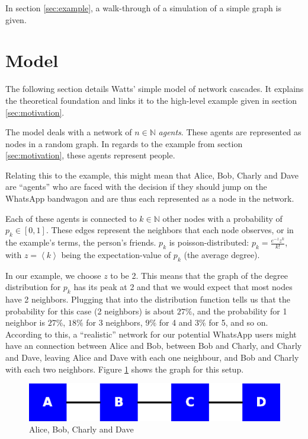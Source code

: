 \documentclass{sig-alternate-05-2015}
\begin{document}
In section \ref{sec:example}, a walk-through of a simulation of a simple graph is given.


\section{Model}\label{sec:model}

The following section details Watts' simple model of network cascades\cite{simplemodel}. It explains the theoretical foundation and links it to the high-level example given in section \ref{sec:motivation}.

The model deals with a network of $n \in \mathbb{N}$ \emph{agents}. These agents are represented as nodes in a random graph. In regards to the example from section \ref{sec:motivation}, these agents represent people.

Relating this to the example, this might mean that Alice, Bob, Charly and Dave are ``agents'' who are faced with the decision if they should jump on the WhatsApp bandwagon and are thus each represented as a node in the network.

Each of these agents is connected to $k \in \mathbb{N}$ other nodes with a probability of $p_k \in [0,1]$. These edges represent the neighbors that each node observes, or in the example's terms, the person's friends. $p_k$ is poisson-distributed: $p_k = \frac{e^{-z}z^k}{k!}$, with $z = \left<k\right>$ being the expectation-value of $p_k$ (the average degree).

In our example, we choose $z$ to be 2. This means that the graph of the degree distribution for $p_k$ has its peak at 2 and that we would expect that most nodes have 2 neighbors. Plugging that into the distribution function tells us that the probability for this case (2 neighbors) is about $27\%$, and the probability for 1 neighbor is $27\%$, $18\%$ for 3 neighbors, $9\%$ for 4 and $3\%$ for 5, and so on. According to this, a ``realistic'' network for our potential WhatsApp users might have an connection between Alice and Bob, between Bob and Charly, and Charly and Dave, leaving Alice and Dave with each one neighbour, and Bob and Charly with each two neighbors. Figure \ref{fig:abcd} shows the graph for this setup.

\begin{figure}[h!]
    \includegraphics[width=\columnwidth]{img/abcd}
    \centering
    \caption{Alice, Bob, Charly and Dave}
    \label{fig:abcd}
\end{figure}
\end{document}
